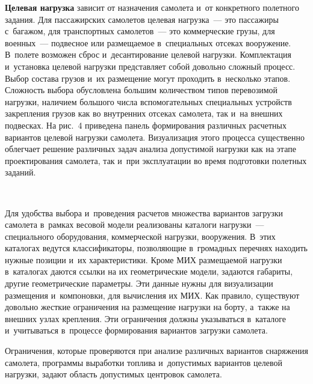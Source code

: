 \begin{multicols}{2}
  \textbf{Целевая нагрузка} зависит от назначения самолета и~от конкретного 
полетного задания. Для пасса\-жирских самолетов целевая нагрузка~--- это 
пассажи\-ры с~багажом, для транспортных са\-мо\-летов~--- это коммерческие 
грузы, для военных~--- подвесное или размещаемое в~специальных \mbox{отсеках} 
вооружение. В~полете возможен сброс и~десантирование целевой нагрузки. 
Комплектация и~установка целевой нагрузки представляет собой довольно 
сложный процесс. Выбор состава грузов и~их размещение могут проходить 
в~несколько этапов. Сложность выбора обусловлена большим количеством 
типов перевозимой нагрузки, наличием большого числа вспомогательных 
специальных устройств закрепления грузов как во внутренних отсеках 
самолета, так и~на внешних подвесках. На рис.~4 приведена панель 
формирования различных расчетных вариантов целевой нагрузки самолета. 
Визуализация этого процесса существенно облегчает решение различных задач 
анализа допустимой нагрузки как на этапе проектирования самолета, так и~при 
эксплуатации во время подготовки полетных заданий.
  
  \begin{figure*} %
\vspace*{1pt}
 \begin{center}
 \mbox{%
 \epsfxsize=162mm 
 }
 \end{center}
\vspace*{-9pt}
\end{figure*}

  Для удобства выбора и~проведения расчетов множества вариантов загрузки 
самолета в~рамках весовой модели реализованы каталоги нагрузки~--- 
специального оборудования, коммерческой нагрузки, вооружения. В~этих 
каталогах ведутся клас\-си\-фи\-ка\-то\-ры, позволяющие в~громадных переч\-нях 
находить нужные позиции и~их характеристики. Кроме  
МИХ размещаемой нагрузки в~каталогах 
даются ссылки на их геометрические модели, задаются габариты, другие 
геометрические па\-ра\-мет\-ры. Эти данные нужны для визуализации размещения 
и~компоновки, для вычисления их МИХ. 
Как правило, существуют довольно жесткие ограничения на 
размещение нагрузки на борту, а~также на внешних узлах крепления. Эти 
ограничения должны указываться в~каталоге и~учитываться в~процессе 
формирования вариантов загрузки самолета. 
  
  Ограничения, которые проверяются при анализе различных вариантов 
снаряжения самолета, программы выработки топлива и~допустимых вариантов 
целевой нагрузки, задают область допустимых центровок самолета. 
  

\end{multicols}
